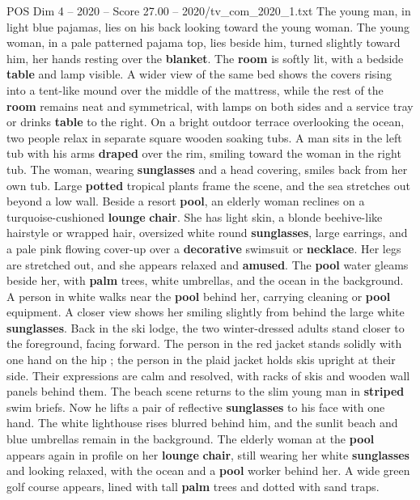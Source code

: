 \begin{textsample}{POS Dim 4 – 2020 – Score 27.00 – 2020/tv\_com\_2020\_1.txt}
The young man, in light blue pajamas, lies on his back looking toward the young woman.
The young woman, in a pale patterned pajama top, lies beside him, turned slightly toward him, her hands resting over the \textbf{blanket}.
The \textbf{room} is softly lit, with a bedside \textbf{table} and lamp visible.
A wider view of the same bed shows the covers rising into a tent-like mound over the middle of the mattress, while the rest of the \textbf{room} remains neat and symmetrical, with lamps on both sides and a service tray or drinks \textbf{table} to the right.
On a bright outdoor terrace overlooking the ocean, two people relax in separate square wooden soaking tubs.
A man sits in the left tub with his arms \textbf{draped} over the rim, smiling toward the woman in the right tub.
The woman, wearing \textbf{sunglasses} and a head covering, smiles back from her own tub.
Large \textbf{potted} tropical plants frame the scene, and the sea stretches out beyond a low wall.
Beside a resort \textbf{pool}, an elderly woman reclines on a turquoise-cushioned \textbf{lounge} \textbf{chair}.
She has light skin, a blonde beehive-like hairstyle or wrapped hair, oversized white round \textbf{sunglasses}, large earrings, and a pale pink flowing cover-up over a \textbf{decorative} swimsuit or \textbf{necklace}.
Her legs are stretched out, and she appears relaxed and \textbf{amused}.
The \textbf{pool} water gleams beside her, with \textbf{palm} trees, white umbrellas, and the ocean in the background.
A person in white walks near the \textbf{pool} behind her, carrying cleaning or \textbf{pool} equipment.
A closer view shows her smiling slightly from behind the large white \textbf{sunglasses}.
Back in the ski lodge, the two winter-dressed adults stand closer to the foreground, facing forward.
The person in the red jacket stands solidly with one hand on the hip ; the person in the plaid jacket holds skis upright at their side.
Their expressions are calm and resolved, with racks of skis and wooden wall panels behind them.
The beach scene returns to the slim young man in \textbf{striped} swim briefs.
Now he lifts a pair of reflective \textbf{sunglasses} to his face with one hand.
The white lighthouse rises blurred behind him, and the sunlit beach and blue umbrellas remain in the background.
The elderly woman at the \textbf{pool} appears again in profile on her \textbf{lounge} \textbf{chair}, still wearing her white \textbf{sunglasses} and looking relaxed, with the ocean and a \textbf{pool} worker behind her.
A wide green golf course appears, lined with tall \textbf{palm} trees and dotted with sand traps.

\end{textsample}
